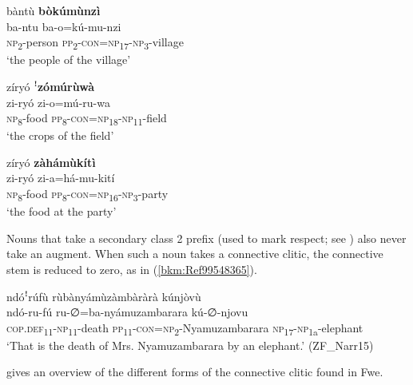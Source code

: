 \ea
\label{bkm:Ref99548320}
bàntù \textbf{bòkúmùnzì}\\
\gll ba-ntu  ba-o=kú-mu-nzi\\
\textsc{np}\textsubscript{2}-person  \textsc{pp}\textsubscript{2}-\textsc{con}=\textsc{np}\textsubscript{17}-\textsc{np}\textsubscript{3}-village\\
\glt ‘the people of the village’
\z

\ea
\label{bkm:Ref75251506}
zíryó ꜝ\textbf{zómúrùwà}\\
\gll zi-ryó    zi-o=mú-ru-wa\\
\textsc{np}\textsubscript{8}-food  \textsc{pp}\textsubscript{8}-\textsc{con}=\textsc{np}\textsubscript{18}-\textsc{np}\textsubscript{11}-field\\
\glt ‘the crops of the field’
\z

\ea
\label{bkm:Ref75251507}
zíryó \textbf{zàhámùkítì}\\
\gll zi-ryó    zi-a=há-mu-kití\\
\textsc{np}\textsubscript{8}-food  \textsc{pp}\textsubscript{8}-\textsc{con}=\textsc{np}\textsubscript{16}-\textsc{np}\textsubscript{3}-party\\
\glt ‘the food at the party’
\z

Nouns that take a secondary class 2 prefix (used to mark respect; see ) also never take an augment. When such a noun takes a connective clitic, the connective stem is reduced to zero, as in (\ref{bkm:Ref99548365}).

\ea
\label{bkm:Ref99548365}
ndóꜝrúfù rùbànyámùzàmbàràrà kúnjòvù\\
\gll ndó-ru-fú      ru-∅=ba-nyámuzambarara    kú-∅-njovu\\
\textsc{cop}.\textsc{def}\textsubscript{11}-\textsc{np}\textsubscript{11}-death  \textsc{pp}\textsubscript{11}-\textsc{con}=\textsc{np}\textsubscript{2}-Nyamuzambarara  \textsc{np}\textsubscript{17}-\textsc{np}\textsubscript{1a}-elephant\\
\glt ‘That is the death of Mrs. Nyamuzambarara by an elephant.’ (ZF\_Narr15)
\z

 gives an overview of the different forms of the connective clitic found in Fwe.

